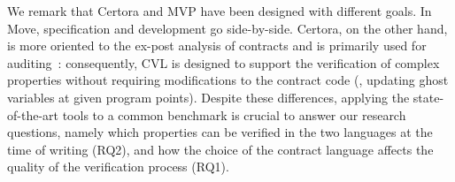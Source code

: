 %
%
%
%
We remark that Certora and MVP have been designed with different goals. 
In Move, specification and development go side-by-side. 
Certora, on the other hand, is more oriented to the ex-post analysis of contracts and is primarily used for auditing~\cite{certora-reports}:
consequently, CVL is designed to support the verification of complex properties without requiring modifications to the contract code (\eg, updating ghost variables at given program points).
%
Despite these differences, applying the state-of-the-art tools to a common benchmark is crucial to answer our research questions, namely which properties can be verified in the two languages at the time of writing (RQ2), and how the choice of the contract language affects the quality of the verification process (RQ1). %


